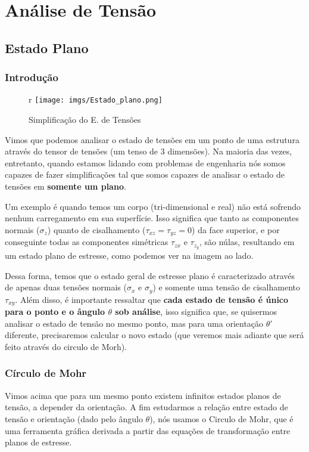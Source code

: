 \documentclass{article}
\begin{document}
\newpage
\section{Análise de Tensão}

\subsection{Estado Plano}
\subsubsection{Introdução}

 \begin{figure}[12]{r}
    \centering
    \texttt{[image: imgs/Estado\_plano.png]}
    \caption{Simplificação do E. de Tensões}
    \label{fig:simp_estado_tensoes}
\end{figure}

Vimos que podemos analisar o estado de tensões em um ponto de uma estrutura através do tensor de tensões (um tenso de 3 dimensões). Na maioria das vezes, entretanto, quando estamos lidando com problemas de engenharia nós somos capazes de fazer simplificações tal que somos capazes de analisar o estado de tensões em \textbf{somente um plano}. 


Um exemplo é quando temos um corpo (tri-dimensional e real) não está sofrendo nenhum carregamento em sua superfície. Isso significa que tanto as componentes normais ($\sigma_z$) quanto de cisalhamento ($\tau_{xz}=\tau_{yz} = 0$) da face superior, e por conseguinte todas as componentes simétricas $\tau_{zx}$ e $\tau_{z_y}$, são núlas, resultando em um estado plano de estresse, como podemos ver na imagem ao lado.

Dessa forma, temos que o estado geral de estresse plano é caracterizado através de apenas duas tensões normais ($\sigma_x$ e $\sigma_y$) e somente uma tensão de cisalhamento $\tau_{xy}$. Além disso, é importante ressaltar que \textbf{cada estado de tensão é único para o ponto e o ângulo $\theta$ sob análise}, isso significa que, se quisermos analisar o estado de tensão no mesmo ponto, mas para uma orientação $\theta'$  diferente, precisaremos calcular o novo estado (que veremos mais adiante que será feito através do circulo de Morh).
 

\subsubsection{Círculo de Mohr}
Vimos acima que para um mesmo ponto existem infinitos estados planos de tensão, a depender da orientação. A fim estudarmos a relação entre estado de tensão e orientação (dado pelo ângulo $\theta$), nós usamos o Circulo de Mohr, que é uma ferramenta gráfica derivada a partir das equações de transformação entre planos de estresse.
\end{document}
